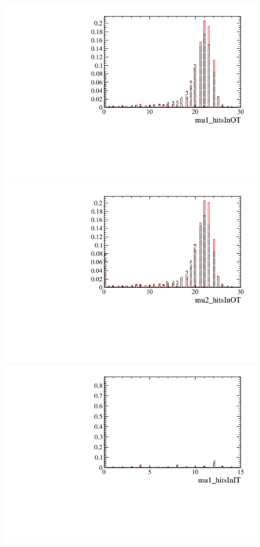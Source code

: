 \begin{figure} [htb!]
\begin{center}
\includegraphics[scale=0.20]{figs/mu1_hitsInOTFULL2pipi.pdf}
\includegraphics[scale=0.20]{figs/mu2_hitsInOTFULL2pipi.pdf}
\includegraphics[scale=0.20]{figs/mu1_hitsInITFULL2pipi.pdf}

\end{center}
\end{figure}
